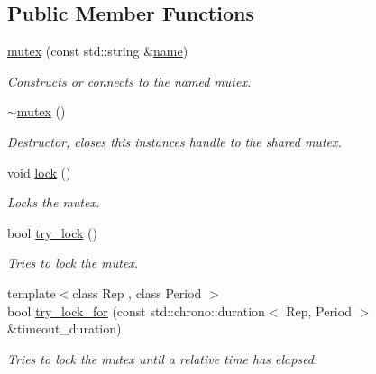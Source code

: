 \subsection*{Public Member Functions}
\begin{DoxyCompactItemize}
\item 
\hyperlink{classcpen333_1_1process_1_1windows_1_1mutex_a6bd2d0c07f83dd5646cbdbadbfc8fc58}{mutex} (const std\+::string \&\hyperlink{classcpen333_1_1process_1_1impl_1_1named__resource__base_ae0c5fbb1843afe863cece4b51c38f807}{name})
\begin{DoxyCompactList}\small\item\em Constructs or connects to the named mutex. \end{DoxyCompactList}\item 
\mbox{\label{classcpen333_1_1process_1_1windows_1_1mutex_a51a169fed979fd4dcb0a4f9c17cdb99e}} 
\hyperlink{classcpen333_1_1process_1_1windows_1_1mutex_a51a169fed979fd4dcb0a4f9c17cdb99e}{$\sim$mutex} ()
\begin{DoxyCompactList}\small\item\em Destructor, closes this instance\textquotesingle{}s handle to the shared mutex. \end{DoxyCompactList}\item 
void \hyperlink{classcpen333_1_1process_1_1windows_1_1mutex_a887f0647207b0e0fa1bead1500c95aec}{lock} ()
\begin{DoxyCompactList}\small\item\em Locks the mutex. \end{DoxyCompactList}\item 
bool \hyperlink{classcpen333_1_1process_1_1windows_1_1mutex_a8fe777a1d576868de91b34d3727132e2}{try\+\_\+lock} ()
\begin{DoxyCompactList}\small\item\em Tries to lock the mutex. \end{DoxyCompactList}\item 
{\footnotesize template$<$class Rep , class Period $>$ }\\bool \hyperlink{classcpen333_1_1process_1_1windows_1_1mutex_aa6a64c60b601c226648cce293835c802}{try\+\_\+lock\+\_\+for} (const std\+::chrono\+::duration$<$ Rep, Period $>$ \&timeout\+\_\+duration)
\begin{DoxyCompactList}\small\item\em Tries to lock the mutex until a relative time has elapsed. \end{DoxyCompactList}\item 

\end{DoxyCompactItemize}
